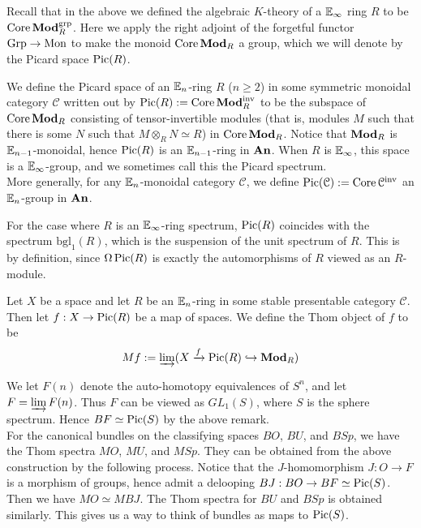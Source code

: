 	Recall that in the above we defined the algebraic $K$-theory of a $\mathbb{E}_\infty$ ring $R$ to be $\operatorname{\mathrm{Core}}\mathbf{Mod}_R^{\operatorname{\mathrm{grp}}}$. Here we apply the right adjoint of the forgetful functor $\mathrm{Grp}\to\mathrm{Mon}$ to make the monoid $\operatorname{\mathrm{Core}}\mathbf{Mod}_R$ a group, which we will denote by the Picard space $\operatorname{\mathrm{Pic}}(R)$. 

	\begin{defn}\label{Picard_space}
		We define the Picard space of an $\mathbb{E}_n$-ring $R$ ($n\geq2$) in some symmetric monoidal category $\mathcal{C}$ written out by $\operatorname{\mathrm{Pic}}(R):=\operatorname{\mathrm{Core}}\mathbf{Mod}_R^{\operatorname{\mathrm{inv}}}$ to be the subspace of $\operatorname{\mathrm{Core}}\mathbf{Mod}_R$ consisting of tensor-invertible modules (that is, modules $M$ such that there is some $N$ such that $M\otimes_RN\simeq R$) in $\operatorname{\mathrm{Core}}\mathbf{Mod}_R$. Notice that $\mathbf{Mod}_R$ is $\mathbb{E}_{n-1}$-monoidal, hence $\operatorname{\mathrm{Pic}}(R)$ is an $\mathbb{E}_{n-1}$-ring in $\mathbf{An}$. When $R$ is $\mathbb{E}_\infty$, this space is a $\mathbb{E}_\infty$-group, and we sometimes call this the Picard spectrum. \\
		More generally, for any $\mathbb{E}_n$-monoidal category $\mathcal{C}$, we define $\operatorname{\mathrm{Pic}}(\mathcal{C}):=\operatorname{\mathrm{Core}}\mathcal{C}^{\operatorname{\mathrm{inv}}}$ an $\mathbb{E}_n$-group in $\mathbf{An}$. 
	\end{defn}

	\begin{remark}
		For the case where $R$ is an $\mathbb{E}_\infty$-ring spectrum, $\operatorname{\mathrm{Pic}}(R)$ coincides with the spectrum $\mathrm{bgl}_1(R)$, which is the suspension of the unit spectrum of $R$. This is by definition, since $\Omega\operatorname{\mathrm{Pic}}(R)$ is exactly the automorphisms of $R$ viewed as an $R$-module. 
	\end{remark}

	\begin{defn}\label{Gen_thom_spectra}
		Let $X$ be a space and let $R$ be an $\mathbb{E}_n$-ring in some stable presentable category $\mathcal{C}$. Then let $f:X\to\operatorname{\mathrm{Pic}}(R)$ be a map of spaces. We define the Thom object of $f$ to be 
		\[ Mf:=\varinjlim(X\xrightarrow{f}\operatorname{\mathrm{Pic}}(R)\hookrightarrow\mathbf{Mod}_R) \]
	\end{defn}

	\begin{exam}
		We let $F(n)$ denote the auto-homotopy equivalences of $S^n$, and let $F=\varinjlim F(n)$. Thus $F$ can be viewed as $GL_1(S)$, where $S$ is the sphere spectrum. Hence $BF\simeq\operatorname{\mathrm{Pic}}(S)$ by the above remark. \\
		For the canonical bundles on the classifying spaces $BO$, $BU$, and $BSp$, we have the Thom spectra $MO$, $MU$, and $MSp$. They can be obtained from the above construction by the following process. Notice that the $J$-homomorphism $J:O\to F$ is a morphism of groups, hence admit a delooping $BJ:BO\to BF\simeq\operatorname{\mathrm{Pic}}(S)$. Then we have $MO\simeq MBJ$. The Thom spectra for $BU$ and $BSp$ is obtained similarly. This gives us a way to think of bundles as maps to $\operatorname{\mathrm{Pic}}(S)$. 
	\end{exam}

